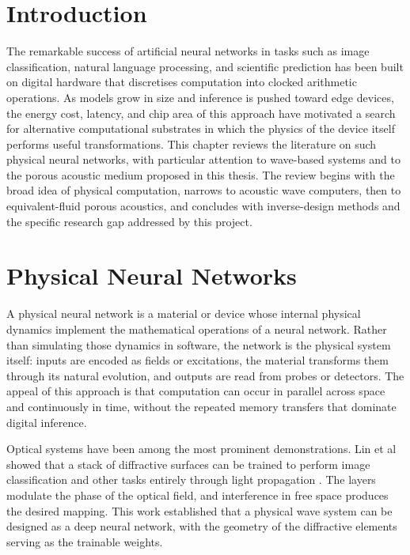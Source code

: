 
\section{Introduction}
\label{sec:lit_intro}

The remarkable success of artificial neural networks in tasks such as image classification, natural language processing, and scientific prediction has been built on digital hardware that discretises computation into clocked arithmetic operations. As models grow in size and inference is pushed toward edge devices, the energy cost, latency, and chip area of this approach have motivated a search for alternative computational substrates in which the physics of the device itself performs useful transformations. This chapter reviews the literature on such physical neural networks, with particular attention to wave-based systems and to the porous acoustic medium proposed in this thesis. The review begins with the broad idea of physical computation, narrows to acoustic wave computers, then to equivalent-fluid porous acoustics, and concludes with inverse-design methods and the specific research gap addressed by this project.

\section{Physical Neural Networks}
\label{sec:lit_pnn}

A physical neural network is a material or device whose internal physical dynamics implement the mathematical operations of a neural network. Rather than simulating those dynamics in software, the network is the physical system itself: inputs are encoded as fields or excitations, the material transforms them through its natural evolution, and outputs are read from probes or detectors. The appeal of this approach is that computation can occur in parallel across space and continuously in time, without the repeated memory transfers that dominate digital inference.

Optical systems have been among the most prominent demonstrations. Lin et al showed that a stack of diffractive surfaces can be trained to perform image classification and other tasks entirely through light propagation \cite{lin2018alloptical}. The layers modulate the phase of the optical field, and interference in free space produces the desired mapping. This work established that a physical wave system can be designed as a deep neural network, with the geometry of the diffractive elements serving as the trainable weights.

